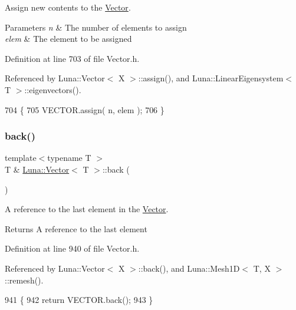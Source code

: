 Assign new contents to the \hyperlink{classLuna_1_1Vector}{Vector}. 


\begin{DoxyParams}{Parameters}
{\em n} & The number of elements to assign \\
\hline
{\em elem} & The element to be assigned \\
\hline
\end{DoxyParams}


Definition at line 703 of file Vector.\+h.



Referenced by Luna\+::\+Vector$<$ X $>$\+::assign(), and Luna\+::\+Linear\+Eigensystem$<$ T $>$\+::eigenvectors().


\begin{DoxyCode}
704   \{
705     VECTOR.assign( n, elem );
706   \}
\end{DoxyCode}
\mbox{\label{classLuna_1_1Vector_add6be56568d90c49e5f616e334275786}} 
\subsubsection{\texorpdfstring{back()}{back()}\hspace{0.1cm}{\footnotesize\ttfamily [1/2]}}
{\footnotesize\ttfamily template$<$typename T $>$ \\
T \& \hyperlink{classLuna_1_1Vector}{Luna\+::\+Vector}$<$ T $>$\+::back (\begin{DoxyParamCaption}{ }\end{DoxyParamCaption})\hspace{0.3cm}{\ttfamily [inline]}}



A reference to the last element in the \hyperlink{classLuna_1_1Vector}{Vector}. 

\begin{DoxyReturn}{Returns}
A reference to the last element 
\end{DoxyReturn}


Definition at line 940 of file Vector.\+h.



Referenced by Luna\+::\+Vector$<$ X $>$\+::back(), and Luna\+::\+Mesh1\+D$<$ T, X $>$\+::remesh().


\begin{DoxyCode}
941   \{
942     \textcolor{keywordflow}{return} VECTOR.back();
943   \}
\end{DoxyCode}
\mbox{\label{classLuna_1_1Vector_a33f7acdc6965592629b2bb375c99cdc4}} 

